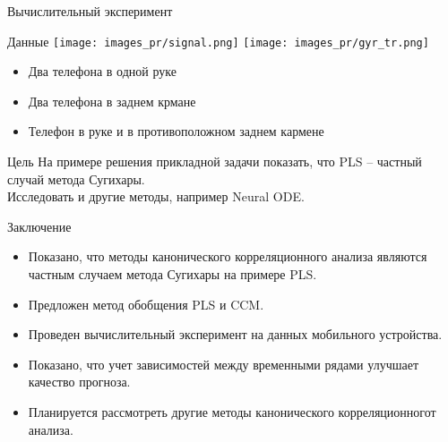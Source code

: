 \documentclass[9pt]{beamer}
\begin{document}
\begin{frame}{Вычислительный эксперимент}
\begin{block}{Данные}
\hfil\texttt{[image: images\_pr/signal.png]}
\hfil\texttt{[image: images\_pr/gyr\_tr.png]}
\begin{itemize}
    \item Два телефона в одной руке
    \item Два телефона в заднем крмане
    \item Телефон в руке и в противоположном заднем кармене
\end{itemize}
\end{block}
\begin{block}{Цель}
	На примере решения прикладной задачи показать, что PLS -- частный случай метода Сугихары.\\
	Исследовать и другие методы, например Neural ODE.
\end{block}

\end{frame}
\begin{frame}{Заключение}
\begin{itemize}
	\item Показано, что методы канонического корреляционного анализа являются частным случаем метода Сугихары на примере PLS.
	\vfill
	\item Предложен метод обобщения PLS и CCM.
	\vfill
	\item Проведен вычислительный эксперимент на данных мобильного устройства.
	\vfill
	\item Показано, что учет зависимостей между временными рядами улучшает качество прогноза.
	\vfill
	\item Планируется рассмотреть другие методы канонического корреляционногот анализа.
\end{itemize}
\end{frame}
\end{document}
